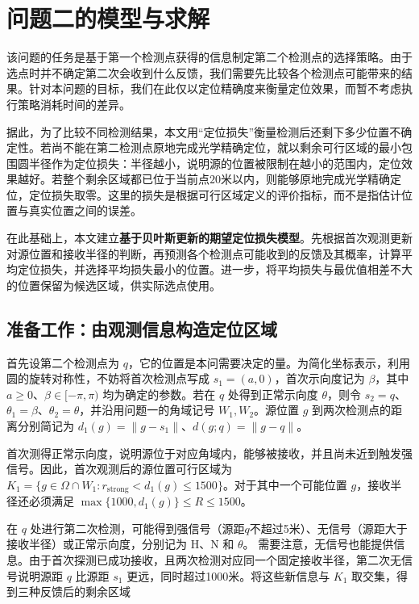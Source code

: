 \section{问题二的模型与求解}

该问题的任务是基于第一个检测点获得的信息制定第二个检测点的选择策略。由于选点时并不确定第二次会收到什么反馈，我们需要先比较各个检测点可能带来的结果。针对本问题的目标，我们在此仅以定位精确度来衡量定位效果，而暂不考虑执行策略消耗时间的差异。

据此，为了比较不同检测结果，本文用“定位损失”衡量检测后还剩下多少位置不确定性。若尚不能在第二检测点原地完成光学精确定位，就以剩余可行区域的最小包围圆半径作为定位损失：半径越小，说明源的位置被限制在越小的范围内，定位效果越好。若整个剩余区域都已位于当前点\(20\)米以内，则能够原地完成光学精确定位，定位损失取零。这里的损失是根据可行区域定义的评价指标，而不是指估计位置与真实位置之间的误差。

在此基础上，本文建立\textbf{基于贝叶斯更新的期望定位损失模型}。先根据首次观测更新对源位置和接收半径的判断，再预测各个检测点可能收到的反馈及其概率，计算平均定位损失，并选择平均损失最小的位置。进一步，将平均损失与最优值相差不大的位置保留为候选区域，供实际选点使用。

\subsection{准备工作：由观测信息构造定位区域}

首先设第二个检测点为 \(q\)，它的位置是本问需要决定的量。为简化坐标表示，利用圆的旋转对称性，不妨将首次检测点写成 \(s_1=(a,0)\)，首次示向度记为 \(\beta\)，其中 \(a\ge0\)、\(\beta\in[-\pi,\pi)\) 均为确定的参数。若在 \(q\) 处得到正常示向度 \(\theta\)，则令 \(s_2=q\)、\(\theta_1=\beta\)、\(\theta_2=\theta\)，并沿用问题一的角域记号 \(W_1,W_2\)。源位置 \(g\) 到两次检测点的距离分别简记为 \(d_1(g)=\|g-s_1\|\)、\(d(g;q)=\|g-q\|\)。

首次测得正常示向度，说明源位于对应角域内，能够被接收，并且尚未近到触发强信号。因此，首次观测后的源位置可行区域为 \(K_1=\{g\in\Omega\cap W_1:r_{\mathrm{strong}}<d_1(g)\le1500\}\)。对于其中一个可能位置 \(g\)，接收半径还必须满足 \(\max\{1000,d_1(g)\}\le R\le1500\)。

在 \(q\) 处进行第二次检测，可能得到强信号（源距\(q\)不超过5米）、无信号（源距大于接收半径）或正常示向度，分别记为 \(\mathrm H\)、\(\mathrm N\) 和 \(\theta\)。
需要注意，无信号也能提供信息。由于首次探测已成功接收，且两次检测对应同一个固定接收半径，第二次无信号说明源距 \(q\) 比源距 \(s_1\) 更远，同时超过1000米。将这些新信息与 \(K_1\) 取交集，得到三种反馈后的剩余区域

